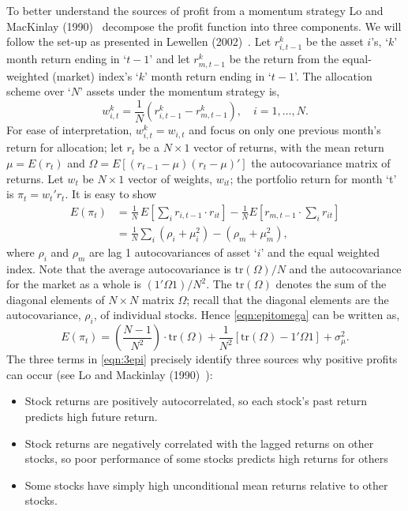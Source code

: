 To better understand the sources of profit from a momentum strategy Lo and MacKinlay (1990)~\cite{lo1990} decompose the profit function into three components. We will follow the set-up as presented in Lewellen (2002)~\cite{lew2002}. Let $r_{i,t-1}^k$ be the asset $i$'s, `$k$' month return ending in `$t-1$' and let $r_{m,t-1}^k$ be the return from the equal-weighted (market) index's `$k$' month return ending in `$t-1$'. The allocation scheme over `$N$' assets under the momentum strategy is,
	\begin{equation} \label{eqn:witkrdiff}
	w_{i,t}^k= \frac{1}{N} (r_{i,t-1}^k - r_{m,t-1}^k), \quad i= 1,\ldots, N.
	\end{equation}
For ease of interpretation, $w_{i,t}^k = w_{i,t}$ and focus on only one previous month's return for allocation; let $r_t$ be a $N \times 1$ vector of returns, with the mean return $\mu = E(r_t)$ and $\Omega = E[(r_{t-1} - \mu)(r_t - \mu)']$ the autocovariance matrix of returns. Let $w_t$ be $N \times 1$ vector of weights, $w_{it}$; the portfolio return for month `t' is $\pi_t = w_t'r_t$. It is easy to show
	\begin{equation} \label{eqn:epitomega}
	\begin{split}
	E(\pi_t)&= \frac{1}{N}\, E\left[\sum_i r_{i,t-1} \cdot r_{it} \right] - \frac{1}{N} E\left[r_{m,t-1} \cdot \sum_i r_{it} \right] \\
	&= \frac{1}{N}\sum_i (\rho_i + \mu_i^2) - (\rho_m + \mu_m^2),
	\end{split}
	\end{equation}
where $\rho_i$ and $\rho_m$ are lag 1 autocovariances of asset `$i$' and the equal weighted index. Note that the average autocovariance is $\text{tr}(\Omega)/N$ and the autocovariance for the market as a whole is $(1' \Omega 1)/N^2$. The $\text{tr}(\Omega)$ denotes the sum of the diagonal elements of $N \times N$ matrix $\Omega$; recall that the diagonal elements are the autocovariance, $\rho_i$, of individual stocks. Hence \eqref{eqn:epitomega} can be written as,
	\begin{equation} \label{eqn:3epi}
	E(\pi_t) = \left(\frac{N-1}{N^2}\right)\cdot \text{tr}(\Omega) + \frac{1}{N^2} [\text{tr}(\Omega) - 1' \Omega 1] + \sigma_{\mu}^2.
	\end{equation}
The three terms in \eqref{eqn:3epi} precisely identify three sources why positive profits can occur (see Lo and Mackinlay (1990)~\cite{lo1990}):


\begin{itemize}
\item Stock returns are positively autocorrelated, so each stock's past return predicts high future return.
\item Stock returns are negatively correlated with the lagged returns on other stocks, so poor performance of some stocks predicts high returns for others
\item Some stocks have simply high unconditional mean returns relative to other stocks.
\end{itemize}


